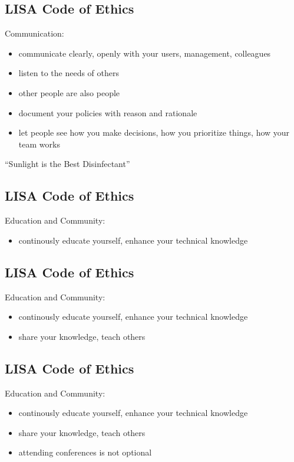 \documentclass[xga]{xdvislides}
\begin{document}
\subsection{LISA Code of Ethics}
Communication:
\begin{itemize}
	\item communicate clearly, openly with your users, management, colleagues
	\item listen to the needs of others
	\item other people are also people
	\item document your policies with reason and rationale
	\item let people see how you make decisions,
		how you prioritize things, how your team works
\end{itemize}
\vspace{.5in}
``Sunlight is the Best Disinfectant''

\subsection{LISA Code of Ethics}
Education and Community:
\begin{itemize}
	\item continously educate yourself, enhance your technical knowledge
\end{itemize}

\subsection{LISA Code of Ethics}
Education and Community:
\begin{itemize}
	\item continously educate yourself, enhance your technical knowledge
	\item share your knowledge, teach others
\end{itemize}

\subsection{LISA Code of Ethics}
Education and Community:
\begin{itemize}
	\item continously educate yourself, enhance your technical knowledge
	\item share your knowledge, teach others
	\item attending conferences is not optional
\end{itemize}
\end{document}
